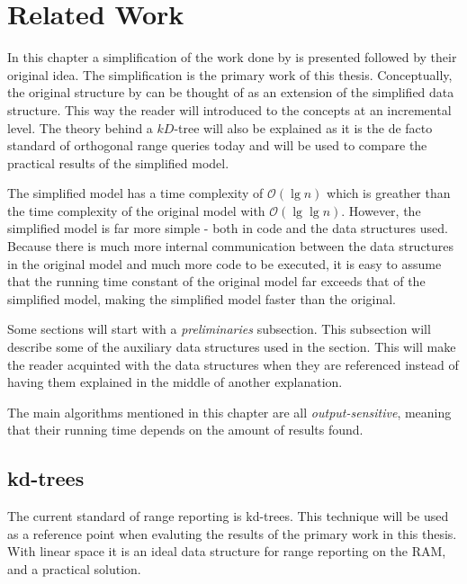 \chapter{Related Work}
\label{ch:relatedwork}


In this chapter a simplification of the work done by \citet{chanetal} is presented followed by their original idea. The simplification is the primary work of this thesis. Conceptually, the original structure by \citet{chanetal} can be thought of as an extension of the simplified data structure. This way the reader will introduced to the concepts at an incremental level. The theory behind a $kD$-tree will also be explained as it is the de facto standard of orthogonal range queries today and will be used to compare the practical results of the simplified model. 

The simplified model has a time complexity of $\mathcal{O}(\lg n)$ which is greather than the time complexity of the original model with $\mathcal{O}(\lg \lg n)$. However, the simplified model is far more simple - both in code and the data structures used. Because there is much more internal communication between the data structures in the original model and much more code to be executed, it is easy to assume  that the running time constant of the original model far exceeds that of the simplified model, making the simplified model faster than the original. 

Some sections will start with a \emph{preliminaries} subsection. This subsection will describe some of the auxiliary data structures used in the section.  This will make the reader acquinted with the data structures when they are referenced instead of having them explained in the middle of another explanation.

The main algorithms mentioned in this chapter are all \emph{output-sensitive}, meaning that their running time depends on the amount of results found.

\section{kd-trees}

The current standard of range reporting is kd-trees. This technique will be used as a reference point when evaluting the results of the primary work in this thesis. With linear space it is an ideal data structure for range reporting on the RAM, and a practical solution.

